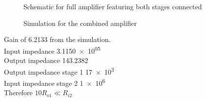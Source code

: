 \documentclass[a4paper,11pt]{article}
\begin{document}
\begin{figure}[H]
	\centering
	\caption{Schematic for full amplifier featuring both stages connected}
	\label{fig:sch_full}
	\hfill
\end{figure}

\begin{figure}[H]
	\centering
	\caption{Simulation for the combined amplifier}
	\label{fig:sim_full}
	\hfill
\end{figure}

\begin{figure}[H]
	\centering
	\label{fig:sim_full_cursors}
	\hfill
\end{figure}

Gain of 6.2133 from the simulation. \\
Input impedance \num{3.1150e+05}\\
Output impedance 143.2382\\

\vspace{10mm}
Output impedance stage 1 \num{17e3}\\
Input impedance stage 2 \num{1e6}\\

Therefore $10 R_{o1} \ll R_{i2} $

%
%

\begin{appendices}

\end{appendices}
\end{document}
